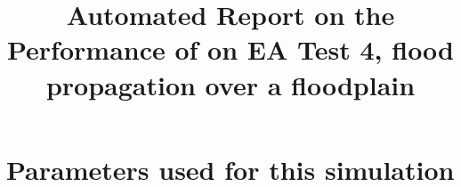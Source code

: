 \documentclass[11pt,a4paper]{article}%
\begin{document}
 

\title{Automated Report on the Performance of \anuga{} on EA Test 4, flood propagation over a floodplain}
\maketitle




\section{Parameters used for this simulation}






\end{document}
